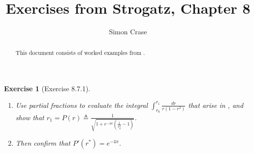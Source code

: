 \documentclass[]{article}
\title{Exercises from Strogatz, Chapter 8}
\author{Simon Crase}
\newtheorem{ex}{Exercise}
\begin{document}
\maketitle

\begin{abstract}
This document consists of worked examples from \cite[Chapter 8]{strogatz:2000}.
\end{abstract}

\begin{ex}[Exercise 8.7.1]
	\begin{enumerate}
		\item Use partial fractions to evaluate the integral $\int_{r_0}^{r_1}\frac{dr}{r(1-r^2)}$ that arise in \cite[Example 8.7.1]{strogatz:2000}, and show that $r_1=P(r)\triangleq\frac{1}{\sqrt{1+e^{-4\pi}(\frac{1}{r_0^2}-1)}}$.\label{item:8.7.1.1}
		\item  Then confirm that $P'(r^*)=e^{-4\pi}$.\label{8.7.1.2}
	\end{enumerate}
\end{ex}
\end{document}
